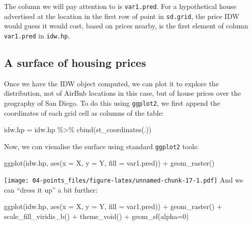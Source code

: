 \documentclass[
]{book}
\newenvironment{Shaded}{\begin{snugshade}}{\end{snugshade}}
\newcommand{\AttributeTok}[1]{\textcolor[rgb]{0.77,0.63,0.00}{#1}}
\newcommand{\DecValTok}[1]{\textcolor[rgb]{0.00,0.00,0.81}{#1}}
\newcommand{\FunctionTok}[1]{\textcolor[rgb]{0.00,0.00,0.00}{#1}}
\newcommand{\NormalTok}[1]{#1}
\newcommand{\OtherTok}[1]{\textcolor[rgb]{0.56,0.35,0.01}{#1}}
\newcommand{\SpecialCharTok}[1]{\textcolor[rgb]{0.00,0.00,0.00}{#1}}
\begin{document}
The column we will pay attention to is \texttt{var1.pred}. For a hypothetical house advertised at the location in the first row of point in \texttt{sd.grid}, the price IDW would guess it would cost, based on prices nearby, is the first element of column \texttt{var1.pred} in \texttt{idw.hp}.

\hypertarget{a-surface-of-housing-prices}{%
\subsection{A surface of housing prices}\label{a-surface-of-housing-prices}}

Once we have the IDW object computed, we can plot it to explore the distribution, not of AirBnb locations in this case, but of house prices over the geography of San Diego. To do this using \texttt{ggplot2}, we first append the coordinates of each grid cell as columns of the table:

\begin{Shaded}
\begin{Highlighting}[]
\NormalTok{idw.hp }\OtherTok{=}\NormalTok{ idw.hp }\SpecialCharTok{\%\textgreater{}\%}
  \FunctionTok{cbind}\NormalTok{(}\FunctionTok{st\_coordinates}\NormalTok{(.))}
\end{Highlighting}
\end{Shaded}

Now, we can visualise the surface using standard \texttt{ggplot2} tools:

\begin{Shaded}
\begin{Highlighting}[]
\FunctionTok{ggplot}\NormalTok{(idw.hp, }\FunctionTok{aes}\NormalTok{(}\AttributeTok{x =}\NormalTok{ X, }\AttributeTok{y =}\NormalTok{ Y, }\AttributeTok{fill =}\NormalTok{ var1.pred)) }\SpecialCharTok{+}
  \FunctionTok{geom\_raster}\NormalTok{()}
\end{Highlighting}
\end{Shaded}

\texttt{[image: 04-points\_files/figure-latex/unnamed-chunk-17-1.pdf]}
And we can ``dress it up'' a bit further:

\begin{Shaded}
\begin{Highlighting}[]
\FunctionTok{ggplot}\NormalTok{(idw.hp, }\FunctionTok{aes}\NormalTok{(}\AttributeTok{x =}\NormalTok{ X, }\AttributeTok{y =}\NormalTok{ Y, }\AttributeTok{fill =}\NormalTok{ var1.pred)) }\SpecialCharTok{+}
  \FunctionTok{geom\_raster}\NormalTok{() }\SpecialCharTok{+}
  \FunctionTok{scale\_fill\_viridis\_b}\NormalTok{() }\SpecialCharTok{+}
  \FunctionTok{theme\_void}\NormalTok{() }\SpecialCharTok{+}
  \FunctionTok{geom\_sf}\NormalTok{(}\AttributeTok{alpha=}\DecValTok{0}\NormalTok{)}
\end{Highlighting}
\end{Shaded}
\end{document}
